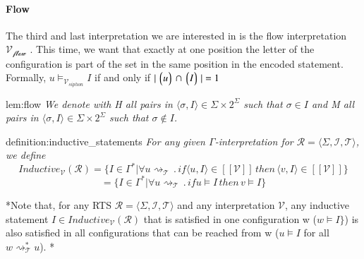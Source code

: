 \paragraph*{Flow}
The third and last interpretation we are interested in is the flow interpretation $\mathcal{V_{flow}}$ .
This time, we want that exactly at one position the letter of the configuration is part of
the set in the same position in the encoded statement.
Formally, $u \models_{\mathcal{V}_{siphon}} I$ if and only if  $|\left\lgroup u \right\rgroup \cap \left\lgroup I \right\rgroup| = 1$
\begin{lem}{lem:flow}
    \textit{We denote with H all pairs in $\langle \sigma, I \rangle \in \Sigma \times 2^{\Sigma}$
    such that  $\sigma \in I$ and M all pairs in $\langle \sigma, I \rangle \in \Sigma \times 2^{\Sigma}$
    such that  $\sigma \notin I$.}

\end{lem}
\begin{theo}{definition:inductive_statements}
    \textit{
        For any given $\Gamma$-\textit{interpretation} for $\mathcal{R} = \langle \Sigma, \mathcal{I}, \mathcal{T} \rangle$, we define
        \[
        Inductive_{\mathcal{V}}(\mathcal{R}) = \lbrace I \in \Gamma^* | 
        \forall u \rightsquigarrow_\mathcal{T} \, . \, if \langle u, I \rangle
        \in [[\mathcal{V}]] \, then \, \langle v, I \rangle \in [[\mathcal{V}]] \rbrace
        \]
        \[=  \lbrace I \in \Gamma^* | 
        \forall u \rightsquigarrow_\mathcal{T} \, . \, if u \models I
            \, then \, v \models I \rbrace\]
    }
\end{theo}

*Note that, for any RTS $\mathcal{R} = \langle \Sigma, \mathcal{I}, \mathcal{T} \rangle$
and any interpretation $\mathcal{V}$, any inductive
statement $I \in Inductive_{\mathcal{V}}(\mathcal{R})$
that is satisfied in one configuration w ($w \models I \rbrace$) is also satisfied
in all configurations that can be reached from w ($u \models I$ for all $w \rightsquigarrow_\mathcal{T}^{*} u$).
*

